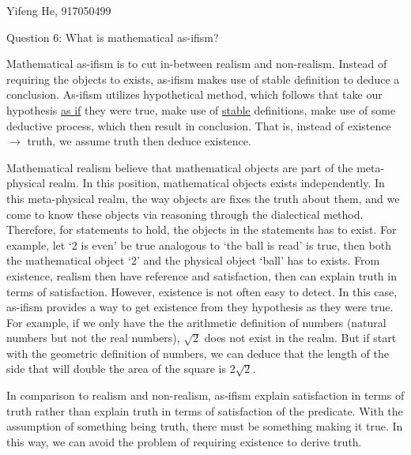 \documentclass[11pt]{article}
\begin{document}
\begin{center}
    Yifeng He, 917050499
\end{center}

\begin{center}
    Question 6: What is mathematical as-ifism?
\end{center}

Mathematical as-ifism is to cut in-between realism and non-realism.
Instead of requiring the objects to exists,
as-ifism makes use of stable definition to deduce a conclusion.
As-ifism utilizes hypothetical method, which follows that
take our hypothesis \underline{as if} they were true,
make use of \underline{stable} definitions,
make use of some deductive process,
which then result in conclusion.
That is, instead of existence $\rightarrow$ truth,
we assume truth then deduce existence. 

Mathematical realism  believe that mathematical objects are part of the meta-physical realm.
In this position, mathematical objects exists independently.
In this meta-physical realm, the way objects are fixes the truth about them,
and we come to know these objects via reasoning through the dialectical method.
Therefore, for statements to hold, the objects in the statements has to exist.
For example, let `2 is even' be true analogous to `the ball is read' is true,
then both the mathematical object `2' and the physical object `ball' has to exists.
From existence, realism then have reference and satisfaction,
then can explain truth in terms of satisfaction.
However, existence is not often easy to detect.
In this case, as-ifism provides a way to get existence from they hypothesis as they were true.
For example, if we only have the the arithmetic definition of numbers (natural numbers but not the real numbers),
$\sqrt{2}$ does not exist in the realm.
But if start with the geometric definition of numbers,
we can deduce that the length of the side that will double the area of the square is $2\sqrt{2}$.

In comparison to realism and non-realism,
as-ifism explain satisfaction in terms of truth
rather than explain truth in terms of satisfaction of the predicate.
With the assumption of something being truth,
there must be something making it true.
In this way, we can avoid the problem of requiring existence to derive truth.
\end{document}
